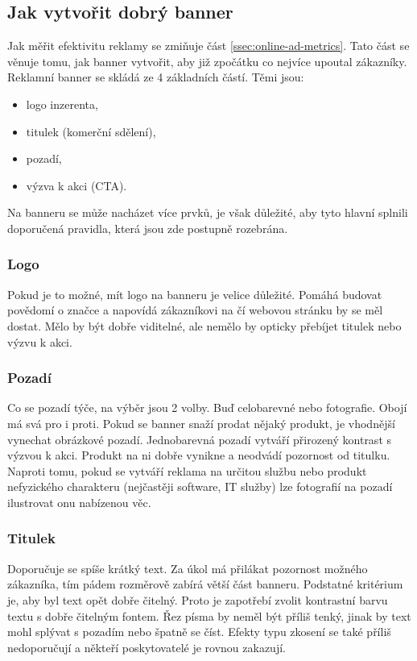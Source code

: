 
    \subsection{Jak vytvořit dobrý banner}
    Jak měřit efektivitu reklamy se zmiňuje část \ref{ssec:online-ad-metrics}. Tato část se věnuje tomu, jak banner vytvořit,
    aby již zpočátku co nejvíce upoutal zákazníky.
    Reklamní banner se skládá ze 4 základních částí. Těmi jsou:
    \begin{itemize}
    \item logo inzerenta,
    \item titulek (komerční sdělení),
    \item pozadí,
    \item výzva k akci (CTA).
    \end{itemize}
    Na banneru se může nacházet více prvků, je však důležité, aby tyto hlavní splnili doporučená pravidla, která jsou zde postupně rozebrána.

    \subsubsection{Logo}
    Pokud je to možné, mít logo na banneru je velice důležité. Pomáhá budovat povědomí o značce a napovídá zákazníkovi na čí webovou stránku by se měl dostat.
    Mělo by být dobře viditelné, ale nemělo by opticky přebíjet titulek nebo výzvu k akci.

    \subsubsection{Pozadí}
    Co se pozadí týče, na výběr jsou 2 volby. Buď celobarevné nebo fotografie. Obojí má svá pro i proti. Pokud se banner snaží prodat nějaký produkt,
    je vhodnější vynechat obrázkové pozadí. Jednobarevná pozadí vytváří přirozený kontrast s výzvou k akci.
    Produkt na ni dobře vynikne a neodvádí pozornost od titulku. Naproti tomu, pokud se vytváří reklama na určitou službu nebo
    produkt nefyzického charakteru (nejčastěji software, IT služby) lze fotografií na pozadí ilustrovat onu nabízenou věc. 

    \subsubsection{Titulek}
    Doporučuje se spíše krátký text. Za úkol má přilákat pozornost možného zákazníka, tím pádem rozměrově zabírá větší část banneru.
    Podstatné kritérium je, aby byl text opět dobře čitelný. Proto je zapotřebí zvolit kontrastní barvu textu s dobře čitelným fontem.
    Řez písma by neměl být příliš tenký, jinak by text mohl splývat s pozadím nebo špatně se číst. Efekty typu zkosení se také příliš nedoporučují a
    někteří poskytovatelé je rovnou zakazují. 

